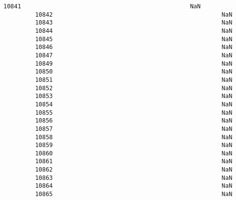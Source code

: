 \documentclass[11pt]{article}
\begin{document}
\begin{Verbatim}[commandchars=\\\{\}]
         10841                                                NaN   
         10842                                                NaN   
         10843                                                NaN   
         10844                                                NaN   
         10845                                                NaN   
         10846                                                NaN   
         10847                                                NaN   
         10849                                                NaN   
         10850                                                NaN   
         10851                                                NaN   
         10852                                                NaN   
         10853                                                NaN   
         10854                                                NaN   
         10855                                                NaN   
         10856                                                NaN   
         10857                                                NaN   
         10858                                                NaN   
         10859                                                NaN   
         10860                                                NaN   
         10861                                                NaN   
         10862                                                NaN   
         10863                                                NaN   
         10864                                                NaN   
         10865                                                NaN   
         

\end{Verbatim}
\end{document}

